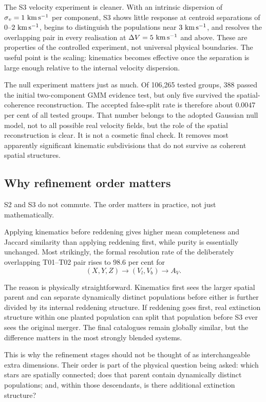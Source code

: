 \documentclass[fleqn,usenatbib]{rasti}
\begin{document}
The S3 velocity experiment is cleaner. With an intrinsic dispersion of $\sigma_v=1~{\rm km\,s^{-1}}$ per component, S3 shows little response at centroid separations of $0$--$2~{\rm km\,s^{-1}}$, begins to distinguish the populations near $3~{\rm km\,s^{-1}}$, and resolves the overlapping pair in every realisation at $\Delta V=5~{\rm km\,s^{-1}}$ and above. These are properties of the controlled experiment, not universal physical boundaries. The useful point is the scaling: kinematics becomes effective once the separation is large enough relative to the internal velocity dispersion.

The null experiment matters just as much. Of 106,265 tested groups, 388 passed the initial two-component GMM evidence test, but only five survived the spatial-coherence reconstruction. The accepted false-split rate is therefore about $0.0047$ per cent of all tested groups. That number belongs to the adopted Gaussian null model, not to all possible real velocity fields, but the role of the spatial reconstruction is clear. It is not a cosmetic final check. It removes most apparently significant kinematic subdivisions that do not survive as coherent spatial structures.

\subsection{Why refinement order matters}

S2 and S3 do not commute. The order matters in practice, not just mathematically.

Applying kinematics before reddening gives higher mean completeness and Jaccard similarity than applying reddening first, while purity is essentially unchanged. Most strikingly, the formal resolution rate of the deliberately overlapping T01--T02 pair rises to 98.6 per cent for
\[
(X,Y,Z)\rightarrow(V_l,V_b)\rightarrow A_V.
\]

The reason is physically straightforward. Kinematics first sees the larger spatial parent and can separate dynamically distinct populations before either is further divided by its internal reddening structure. If reddening goes first, real extinction structure within one planted population can split that population before S3 ever sees the original merger. The final catalogues remain globally similar, but the difference matters in the most strongly blended systems.

This is why the refinement stages should not be thought of as interchangeable extra dimensions. Their order is part of the physical question being asked: which stars are spatially connected; does that parent contain dynamically distinct populations; and, within those descendants, is there additional extinction structure?
\end{document}
